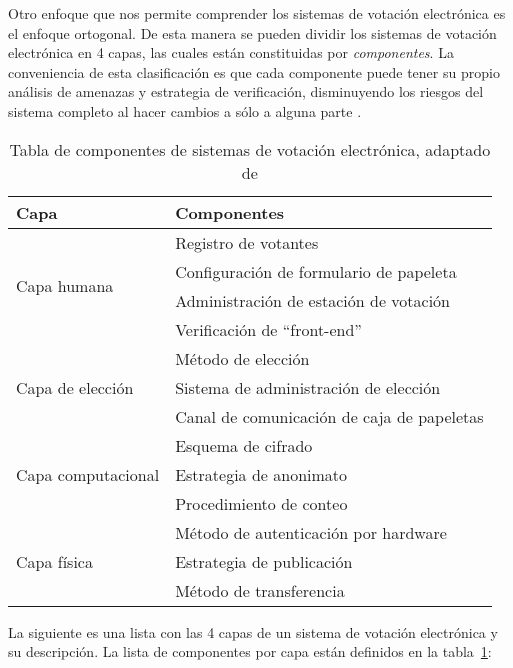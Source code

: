 Otro enfoque que nos permite comprender los sistemas de votación electrónica es el 
enfoque ortogonal. De esta manera se pueden dividir los sistemas de votación electrónica en
4 capas, las cuales están constituidas por \textit{componentes}. 
La conveniencia de esta clasificación es que cada componente
puede tener su propio análisis de amenazas y estrategia de verificación,
disminuyendo los riesgos del sistema completo al hacer cambios a
sólo a alguna parte \cite{Lundin2010}.

\begin{table}[h!]
\centering
\begin{tabularx}{\textwidth}{p{3.5cm} X} 
\toprule[1.5pt]
	\bf 	Capa	& \bf 	Componentes 	\\ \hline
	\multirow{4}{*}{Capa humana}        		&	Registro de votantes	\\
									&	Configuración de formulario de papeleta	\\
									&	Administración de estación de votación \\
									&	Verificación de “front-end” \\ \hline 
	\multirow{3}{*}{Capa de elección}		&	Método de elección	\\
									&	Sistema de administración de elección	\\
									&	Canal de comunicación de caja de papeletas \\  \hline
	\multirow{3}{*}{Capa computacional}	&	Esquema de cifrado	\\
									&	Estrategia de anonimato \\
									&	Procedimiento de conteo \\  \hline				
	\multirow{3}{*}{Capa física}			&	Método de autenticación por hardware \\
									&	Estrategia de publicación \\
									&	Método de transferencia \\ 
					
\bottomrule[1.25pt]
\end{tabularx}
\caption[Tabla de componentes de sistemas de votación electrónica]{Tabla de componentes de sistemas de votación electrónica, adaptado de \cite{Lundin2010}}
\label{tab:componentes}
\end{table}


La siguiente es una lista con las 4 capas de un sistema de votación 
electrónica y su descripción. La lista de componentes por capa están definidos 
en la tabla~\ref{tab:componentes}:

